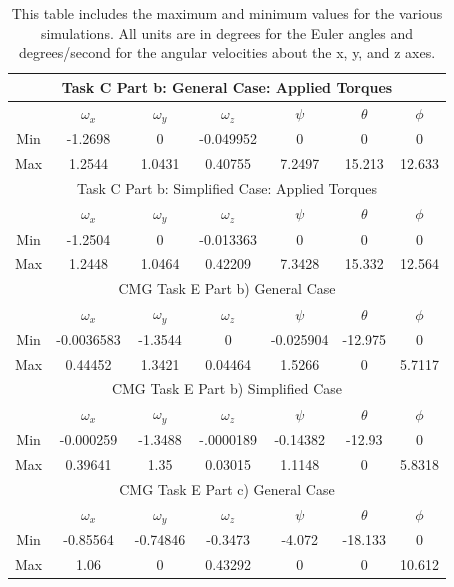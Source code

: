 \documentclass{article}
\begin{document}
\begin{table}[H]
\centering
\begin{tabular}{c|c|c|c|c|c|c}
 \multicolumn{7}{c}{Task C Part b: General Case: Applied Torques} \\
 \hline
 & $\omega_x$ & $\omega_y$ & $\omega_z$ & $\psi$ & $\theta$ & $\phi$ \\
 \hline
 Min & -1.2698 & 0 & -0.049952 & 0 &  0 & 0\\
 \hline 
 Max & 1.2544 & 1.0431 & 0.40755 & 7.2497 & 15.213 & 12.633 \\
 \hline
 \multicolumn{7}{c}{Task C Part b: Simplified Case: Applied Torques} \\
 \hline
 & $\omega_x$ & $\omega_y$ & $\omega_z$ & $\psi$ & $\theta$ & $\phi$ \\
 \hline
 Min & -1.2504 & 0 & -0.013363 & 0 & 0 & 0\\
 \hline 
 Max & 1.2448 & 1.0464 &  0.42209 & 7.3428 & 15.332 & 12.564 \\
 \hline
 \multicolumn{7}{c}{CMG Task E Part b) General Case} \\
 \hline
 & $\omega_x$ & $\omega_y$ & $\omega_z$ & $\psi$ & $\theta$ & $\phi$ \\
 \hline
 Min & -0.0036583 & -1.3544 & 0 & -0.025904 & -12.975 & 0\\
 \hline 
 Max & 0.44452 & 1.3421 & 0.04464 & 1.5266 & 0 & 5.7117 \\
 \hline
 \multicolumn{7}{c}{CMG Task E Part b) Simplified Case} \\
 \hline
 & $\omega_x$ & $\omega_y$ & $\omega_z$ & $\psi$ & $\theta$ & $\phi$ \\
 \hline
 Min & -0.000259 & -1.3488 & -.0000189 & -0.14382 & -12.93 & 0\\
 \hline 
 Max & 0.39641 & 1.35 & 0.03015 & 1.1148 & 0 & 5.8318 \\
 \hline
 \multicolumn{7}{c}{CMG Task E Part c) General Case} \\
 \hline
 & $\omega_x$ & $\omega_y$ & $\omega_z$ & $\psi$ & $\theta$ & $\phi$ \\
 \hline
 Min & -0.85564 & -0.74846 & -0.3473 & -4.072 & -18.133 & 0\\
 \hline 
 Max & 1.06 & 0 & 0.43292 & 0 & 0 & 10.612 \\
 \hline
\end{tabular}
 \caption{\label{tab:max_min}This table includes the maximum and minimum values for the various simulations. All units are in degrees for the Euler angles and degrees/second for the angular velocities about the x, y, and z axes.}
\end{table}
\end{document}
